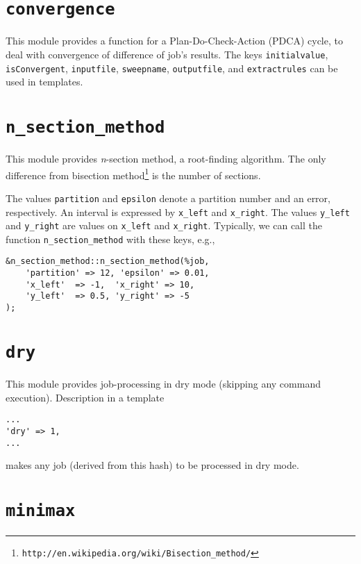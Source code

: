 \documentclass[a4paper,10pt]{report}
\begin{document}
\section{\texttt{convergence}}

This module provides a function for a Plan-Do-Check-Action (PDCA)
cycle, to deal with convergence of difference of job's results.  The
keys \texttt{initialvalue}, \texttt{isConvergent}, \texttt{inputfile},
\texttt{sweepname}, \texttt{outputfile}, and \texttt{extractrules} can
be used in templates.

\section{\texttt{n\_section\_method}}

This module provides \textit{n}-section method, a root-finding
algorithm. The only difference from bisection
method\footnote{\texttt{http://en.wikipedia.org/wiki/Bisection\_method/}}
is the number of sections.

The values \texttt{partition} and \texttt{epsilon} denote
    a partition number and an error, respectively.  An interval is
    expressed by \texttt{x\_left} and \texttt{x\_right}.  The values
    \texttt{y\_left} and \texttt{y\_right} are values on \texttt{x\_left}
    and \texttt{x\_right}.  Typically, we can call the function
    \texttt{n\_section\_method} with these keys, e.g.,
\begin{boxnote}
\begin{verbatim}
&n_section_method::n_section_method(%job,
    'partition' => 12, 'epsilon' => 0.01,
    'x_left'  => -1,  'x_right' => 10,
    'y_left'  => 0.5, 'y_right' => -5
);
\end{verbatim}
\end{boxnote}

\section{\texttt{dry}}

This module provides job-processing in dry mode (skipping any command
execution).  Description in a template
\begin{boxnote}
\begin{verbatim}
...
'dry' => 1,
...
\end{verbatim}
\end{boxnote}
\noindent
makes any job (derived from this hash) to be processed in dry mode.

\section{\texttt{minimax}}
\end{document}

